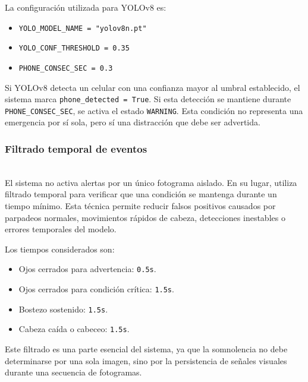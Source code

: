 \documentclass[conference]{IEEEtran}
\begin{document}
La configuración utilizada para YOLOv8 es:

\begin{itemize}
    \item \texttt{YOLO\_MODEL\_NAME = "yolov8n.pt"}
    
    \item \texttt{YOLO\_CONF\_THRESHOLD = 0.35}
    
    \item \texttt{PHONE\_CONSEC\_SEC = 0.3}
\end{itemize}

Si YOLOv8 detecta un celular con una confianza mayor al umbral establecido, el sistema marca \texttt{phone\_detected = True}. Si esta detección se mantiene durante \texttt{PHONE\_CONSEC\_SEC}, se activa el estado \texttt{WARNING}. Esta condición no representa una emergencia por sí sola, pero sí una distracción que debe ser advertida.\\


\subsubsection{Filtrado temporal de eventos}\mbox{}\\

El sistema no activa alertas por un único fotograma aislado. En su lugar, utiliza filtrado temporal para verificar que una condición se mantenga durante un tiempo mínimo. Esta técnica permite reducir falsos positivos causados por parpadeos normales, movimientos rápidos de cabeza, detecciones inestables o errores temporales del modelo.

Los tiempos considerados son:

\begin{itemize}
    \item Ojos cerrados para advertencia: \texttt{0.5s}.
    
    \item Ojos cerrados para condición crítica: \texttt{1.5s}.
    
    \item Bostezo sostenido: \texttt{1.5s}.
    
    \item Cabeza caída o cabeceo: \texttt{1.5s}.
\end{itemize}

Este filtrado es una parte esencial del sistema, ya que la somnolencia no debe determinarse por una sola imagen, sino por la persistencia de señales visuales durante una secuencia de fotogramas.
\end{document}
